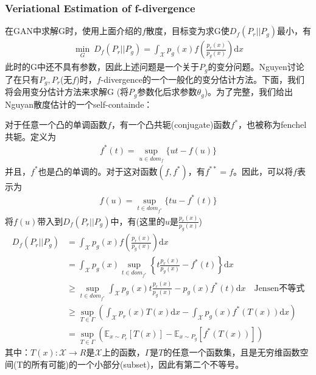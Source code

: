         \subsubsection{Veriational Estimation of f-divergence}
            \par
            在GAN中求解G时，使用上面介绍的$f$散度，目标变为求G使$D_f(P_r||P_g)$最小，有
            \begin{align*}
            \min_G\ D_f(P_r||P_g) = \int_\mathcal{X}p_g(x)f \left( \frac{p_r(x)}{p_g(x)} \right) \mathrm{d}x
            \end{align*}
            此时的G中还不具有参数，因此上述问题是一个关于$P_g$的变分问题。Nguyen讨论了在只有$P_g,P_r$(无$f$)时，$f$-divergence的一个一般化的变分估计方法。下面，我们将会用变分估计方法来求解G (将$P_g$参数化后求参数$\theta_g$)。为了完整，我们给出Nguyan散度估计的一个self-containde：
            \par
            对于任意一个凸的单调函数$f$，有一个凸共轭(conjugate)函数$f^*$，也被称为fenchel共轭。定义为
            \begin{align*}
            f^*(t) = \sup_{u\in dom_f}\{ut - f(u)\}
            \end{align*}
            并且，$f^*$也是凸的单调的。对于这对函数$(f,f^*)$，有$f^{**} = f$。因此，可以将$f$表示为
            \begin{align*}
            f(u) = \sup_{t\in dom_{f^*}} \{tu - f^*(t)\}
            \end{align*}
            将$f(u)$带入到$D_f(P_r||P_g)$中，有(这里的$u$是$\frac{p_r(x)}{p_g(x)}$)
            \begin{align*}
            D_f(P_r||P_g) & = \int_\mathcal{X} p_g(x )f \left( \frac{p_r(x)}{p_g(x)} \right)\mathrm{d}x\\
            & =\int _\mathcal{X} p_g(x) \sup_{t\in dom_{f^*}} \left\{t\frac{p_r(x)}{p_g(x)} - f^*(t)\right\} \mathrm{d}x \\
            &\geqslant \sup_{t\in dom_{f^*}}\int_\mathcal{X} p_g(x) t\frac{p_r(x)}{p_g(x)} - p_g(x)f^*(t)\mathrm{d}x \quad \text{Jensen不等式}\\
            &\geqslant \sup _{T\in \Gamma} \left( \int_\mathcal{X}p_r(x)T(x)\mathrm{d}x - \int_\mathcal{X} p_g(x)f^*(T(x))\mathrm{d}x \right)\\
            & = \sup _{T\in \Gamma} \left( \mathbb{E}_{x\sim  P_r}[T(x)] - \mathbb{E}_{x\sim  P_g}[f^*(T(x))] \right)
            \end{align*}
            其中：$T(x):\mathcal{X}\to R$是$\mathcal{X}$上的函数，$\Gamma$是$T$的任意一个函数集，且是无穷维函数空间(T的所有可能)的一个小部分(subset)，因此有第二个不等号。
